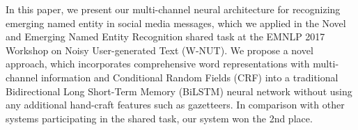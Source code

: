 In this paper, we present our multi-channel neural architecture for recognizing emerging named entity in social media messages, which we applied in the Novel and Emerging Named Entity Recognition shared task at the EMNLP 2017 Workshop on Noisy User-generated Text (W-NUT). We propose a novel approach, which incorporates comprehensive word representations with multi-channel information and Conditional Random Fields (CRF) into a traditional Bidirectional Long Short-Term Memory (BiLSTM) neural network without using any additional hand-craft features such as gazetteers. In comparison with other systems participating in the shared task, our system won the 2nd place.
